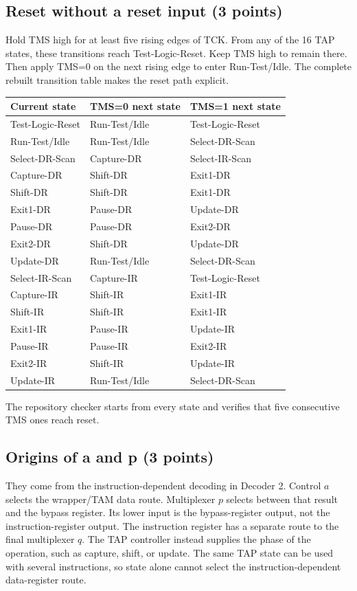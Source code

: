 \subsection{Reset without a reset input (3 points)}
\answer Hold TMS high for at least five rising edges of TCK. From any of the 16 TAP states, these transitions reach Test-Logic-Reset. Keep TMS high to remain there. Then apply TMS=0 on the next rising edge to enter Run-Test/Idle. The complete rebuilt transition table makes the reset path explicit.
\begin{center}\small
\begin{tabular}{lll}
\toprule Current state&TMS=0 next state&TMS=1 next state\\\midrule
Test-Logic-Reset&Run-Test/Idle&Test-Logic-Reset\\
Run-Test/Idle&Run-Test/Idle&Select-DR-Scan\\
Select-DR-Scan&Capture-DR&Select-IR-Scan\\
Capture-DR&Shift-DR&Exit1-DR\\
Shift-DR&Shift-DR&Exit1-DR\\
Exit1-DR&Pause-DR&Update-DR\\
Pause-DR&Pause-DR&Exit2-DR\\
Exit2-DR&Shift-DR&Update-DR\\
Update-DR&Run-Test/Idle&Select-DR-Scan\\
Select-IR-Scan&Capture-IR&Test-Logic-Reset\\
Capture-IR&Shift-IR&Exit1-IR\\
Shift-IR&Shift-IR&Exit1-IR\\
Exit1-IR&Pause-IR&Update-IR\\
Pause-IR&Pause-IR&Exit2-IR\\
Exit2-IR&Shift-IR&Update-IR\\
Update-IR&Run-Test/Idle&Select-DR-Scan\\
\bottomrule
\end{tabular}
\end{center}
The repository checker starts from every state and verifies that five consecutive TMS ones reach reset.

\subsection{Origins of a and p (3 points)}
\answer They come from the instruction-dependent decoding in Decoder 2. Control $a$ selects the wrapper/TAM data route. Multiplexer $p$ selects between that result and the bypass register. Its lower input is the bypass-register output, not the instruction-register output. The instruction register has a separate route to the final multiplexer $q$. The TAP controller instead supplies the phase of the operation, such as capture, shift, or update. The same TAP state can be used with several instructions, so state alone cannot select the instruction-dependent data-register route.

